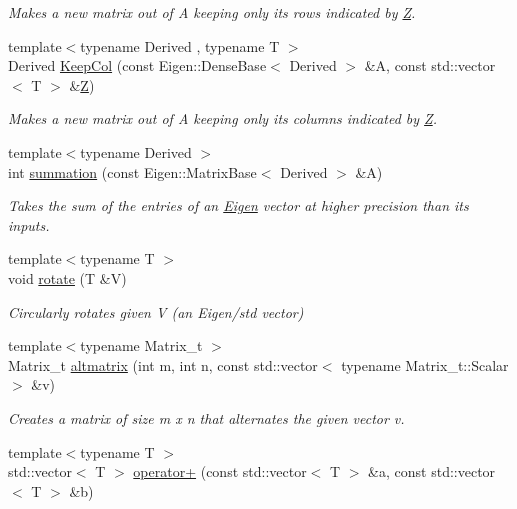 \begin{DoxyCompactItemize}
\begin{DoxyCompactList}\small\item\em Makes a new matrix out of A keeping only its rows indicated by \hyperlink{classZ}{Z}. \end{DoxyCompactList}\item 
{\footnotesize template$<$typename Derived , typename T $>$ }\\Derived \hyperlink{namespaceMackey_a782d9ce52543c3ae3520b4859dda3240}{Keep\+Col} (const Eigen\+::\+Dense\+Base$<$ Derived $>$ \&A, const std\+::vector$<$ T $>$ \&\hyperlink{classZ}{Z})
\begin{DoxyCompactList}\small\item\em Makes a new matrix out of A keeping only its columns indicated by \hyperlink{classZ}{Z}. \end{DoxyCompactList}\item 
{\footnotesize template$<$typename Derived $>$ }\\int \hyperlink{namespaceMackey_a359aa27a035d2b1f1a3f2f8270fc9e52}{summation} (const Eigen\+::\+Matrix\+Base$<$ Derived $>$ \&A)
\begin{DoxyCompactList}\small\item\em Takes the sum of the entries of an \hyperlink{namespaceEigen}{Eigen} vector at higher precision than its inputs. \end{DoxyCompactList}\item 
{\footnotesize template$<$typename T $>$ }\\void \hyperlink{namespaceMackey_a38a833de54971845cbdb8c96f830725b}{rotate} (T \&V)
\begin{DoxyCompactList}\small\item\em Circularly rotates given V (an Eigen/std vector) \end{DoxyCompactList}\item 
{\footnotesize template$<$typename Matrix\+\_\+t $>$ }\\Matrix\+\_\+t \hyperlink{namespaceMackey_a26a529f63caac9c5b4dc809e0e5831be}{altmatrix} (int m, int n, const std\+::vector$<$ typename Matrix\+\_\+t\+::\+Scalar $>$ \&v)
\begin{DoxyCompactList}\small\item\em Creates a matrix of size m x n that alternates the given vector v. \end{DoxyCompactList}\item 
{\footnotesize template$<$typename T $>$ }\\std\+::vector$<$ T $>$ \hyperlink{namespaceMackey_adb4974b5ffe533abb955ccb6b9096155}{operator+} (const std\+::vector$<$ T $>$ \&a, const std\+::vector$<$ T $>$ \&b)

\end{DoxyCompactItemize}
